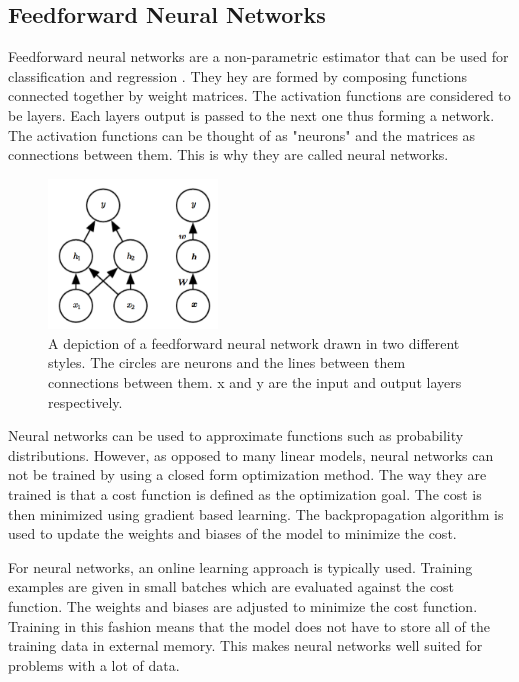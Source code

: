 
\subsection{Feedforward Neural Networks}

Feedforward neural networks are a non-parametric estimator that can be used for classification and regression \cite{alpaydin}. They hey are formed by composing functions connected together by weight matrices. The activation functions are considered to be layers. Each layers output is passed to the next one thus forming a network. The activation functions can be thought of as "neurons" and the matrices as connections between them. This is why they are called neural networks. \cite{deep-learning-book}

\begin{figure}[H]
\centering
\includegraphics[width=0.4\textwidth]{images/nnet.png}
\caption{
A depiction of a feedforward neural network drawn in two different styles. The circles are neurons and the lines between them connections between them. x and y are the input and output layers respectively. \cite{deep-learning-book}
}
\label{fig:nnet}
\end{figure}

Neural networks can be used to approximate functions such as probability distributions. However, as opposed to many linear models, neural networks can not be trained by using a closed form optimization method. The way they are trained is that a cost function is defined as the optimization goal. The cost is then minimized using gradient based learning. The backpropagation algorithm is used to update the weights and biases of the model to minimize the cost. \cite{deep-learning-book}

For neural networks, an online learning approach is typically used. Training examples are given in small batches which are evaluated against the cost function. The weights and biases are adjusted to minimize the cost function. Training in this fashion means that the model does not have to store all of the training data in external memory. This makes neural networks well suited for problems with a lot of data. \cite{deep-learning-book}

